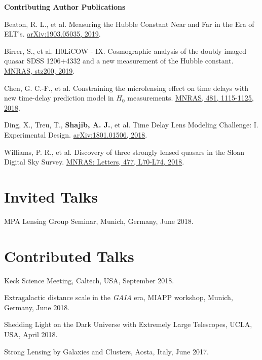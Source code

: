 \documentclass[margin, line]{res}
\begin{document}
\begin{resume}
\textbf{Contributing Author Publications} \\
\begin{etaremune}
	\item Beaton, R. L., et al. Measuring the Hubble Constant Near and Far in the Era of ELT's. \href{https://arxiv.org/abs/1903.05035}{arXiv:1903.05035, 2019}.
	\item Birrer, S., et al. H0LiCOW - IX. Cosmographic analysis of the doubly imaged quasar SDSS 1206+4332 and a new measurement of the Hubble constant. \href{https://doi.org/10.1093/mnras/stz200}{MNRAS, stz200, 2019}.
	\item Chen, G. C.-F., et al. Constraining the microlensing effect on time delays with new time-delay prediction model in $H_0$ measurements. \href{https://doi.org/10.1093/mnras/sty2350}{MNRAS, 481, 1115-1125, 2018}.
	\item Ding, X., Treu, T., {\bf Shajib, A. J.}, et al. Time Delay Lens Modeling Challenge: I. Experimental Design. \href{https://arxiv.org/abs/1801.01506}{arXiv:1801.01506, 2018}.
 	\item Williams, P. R., et al. Discovery of three strongly lensed quasars in the Sloan Digital Sky Survey. \href{https://doi.org/10.1093/mnrasl/sly043}{MNRAS: Letters, 477, L70-L74, 2018}.
\end{etaremune}


\section{\sc Invited Talks}
\begin{etaremune}
	\item MPA Lensing Group Seminar, Munich, Germany, June 2018.
\end{etaremune}


\section{\sc Contributed Talks}
\begin{etaremune}
	\item Keck Science Meeting, Caltech, USA, September 2018.
	\item Extragalactic distance scale in the \textit{GAIA} era, MIAPP workshop, Munich, Germany, June 2018.
	\item Shedding Light on the Dark Universe with Extremely Large Telescopes, UCLA, USA, April 2018.
	\item Strong Lensing by Galaxies and Clusters, Aosta, Italy, June 2017.
\end{etaremune}



\end{resume}
\end{document}
